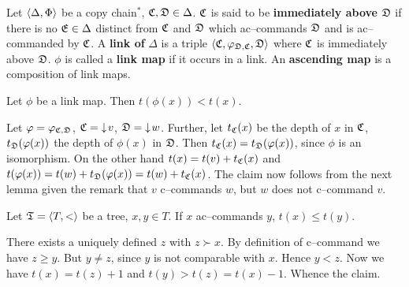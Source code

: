 \begin{defn}
Let $\langle \Delta, \Phi\rangle$ be a copy chain$^{\ast}$, $\mathfrak{C}, \mathfrak{D} \in \Delta$.
$\mathfrak{C}$ is said to be \textbf{immediately above} $\mathfrak{D}$ if there is no
$\mathfrak{E} \in \Delta$ distinct from $\mathfrak{C}$ and $\mathfrak{D}$ which ac--commands
$\mathfrak{D}$ and is ac--commanded by $\mathfrak{C}$. A \textbf{link of} $\Delta$ is
a triple $\langle \mathfrak{C}, \varphi_{\mathfrak{D},\mathfrak{C}}, \mathfrak{D}\rangle$ where $\mathfrak{C}$ is immediately
above $\mathfrak{D}$. $\phi$ is called a \textbf{link map} if it occurs in a
link. An \textbf{ascending map} is a composition of link maps.
\end{defn}
\begin{lem}
Let $\phi$ be a link map. Then $t(\phi(x)) < t(x)$.
\end{lem}
\proofbeg
Let $\varphi = \varphi_{\mathfrak{C},\mathfrak{D}}$, $\mathfrak{C} = {\downarrow\! v}$, $\mathfrak{D} = {\downarrow\! w}$.
Further, let $t_{\mathfrak{C}}(x)$ be the depth of $x$ in $\mathfrak{C}$,
$t_{\mathfrak{D}}(\varphi(x))$ the depth of $\phi(x)$ in $\mathfrak{D}$. Then
$t_{\mathfrak{C}}(x) = t_{\mathfrak{D}}(\varphi(x))$, since $\phi$ is an isomorphism.
On the other hand $t(x) = t(v) + t_{\mathfrak{C}}(x)$ and $t(\varphi(x)) = t(w) +
t_{\mathfrak{D}}(\varphi(x))  = t(w) + t_{\mathfrak{C}}(x)$. The claim now follows
from the next lemma given the remark that $v$ c--commands $w$,
but $w$ does not c--command $v$.
\proofend
\begin{lem}
Let $\mathfrak{T} = \langle T, <\rangle$ be a tree, $x, y \in T$.
If $x$ ac--commands $y$, $t(x) \leq t(y)$.
\end{lem}
\proofbeg
There exists a uniquely defined $z$ with $z \succ x$. By
definition of c--command we have $z \geq y$. But $y \neq z$,
since $y$ is not comparable with $x$. Hence $y < z$. Now we
have $t(x) = t(z) + 1$ and $t(y) > t(z) = t(x) - 1$. Whence
the claim.
\proofend

